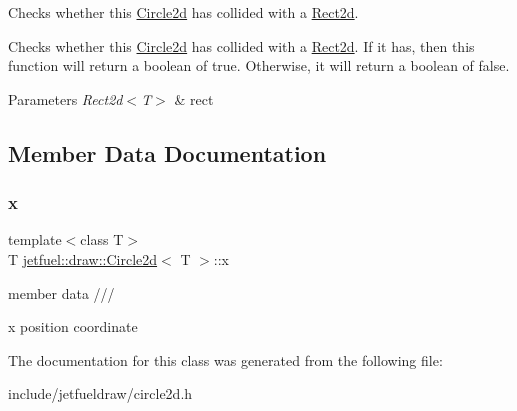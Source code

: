 Checks whether this \hyperlink{classjetfuel_1_1draw_1_1Circle2d}{Circle2d} has collided with a \hyperlink{classjetfuel_1_1draw_1_1Rect2d}{Rect2d}. 

Checks whether this \hyperlink{classjetfuel_1_1draw_1_1Circle2d}{Circle2d} has collided with a \hyperlink{classjetfuel_1_1draw_1_1Rect2d}{Rect2d}. If it has, then this function will return a boolean of true. Otherwise, it will return a boolean of false.


\begin{DoxyParams}{Parameters}
{\em Rect2d$<$\+T$>$} & rect \\
\hline
\end{DoxyParams}


\subsection{Member Data Documentation}
\mbox{\label{classjetfuel_1_1draw_1_1Circle2d_a9aa0ccc7733d735950352373e2a72352}} 
\subsubsection{\texorpdfstring{x}{x}}
{\footnotesize\ttfamily template$<$class T$>$ \\
T \hyperlink{classjetfuel_1_1draw_1_1Circle2d}{jetfuel\+::draw\+::\+Circle2d}$<$ T $>$\+::x}



member data /// 

x position coordinate 

The documentation for this class was generated from the following file\+:\begin{DoxyCompactItemize}
\item 
include/jetfueldraw/circle2d.\+h\end{DoxyCompactItemize}
